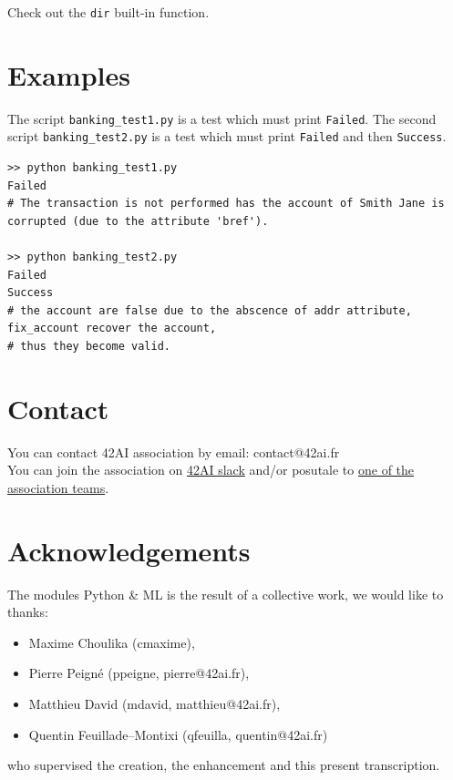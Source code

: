 \documentclass{42-en}
\begin{document}
Check out the \texttt{dir} built-in function.


\section*{Examples}
The script \texttt{banking\_test1.py} is a test which must print \texttt{Failed}.
The second script \texttt{banking\_test2.py} is a test which must print \texttt{Failed} and then \texttt{Success}.

\begin{verbatim}
>> python banking_test1.py
Failed
# The transaction is not performed has the account of Smith Jane is corrupted (due to the attribute 'bref').

>> python banking_test2.py
Failed
Success
# the account are false due to the abscence of addr attribute, fix_account recover the account,
# thus they become valid.
\end{verbatim}



\newpage

\section*{Contact}
You can contact 42AI association by email: contact@42ai.fr\\
You can join the association on \href{https://join.slack.com/t/42-ai/shared_invite/zt-ebccw5r7-YPkDM6xOiYRPjqJXkrKgcA}{42AI slack}
and/or posutale to \href{https://forms.gle/VAFuREWaLmaqZw2D8}{one of the association teams}.

\section*{Acknowledgements}
The modules Python \& ML is the result of a collective work, we would like to thanks:
\begin{itemize}
  \item Maxime Choulika (cmaxime),
  \item Pierre Peigné (ppeigne, pierre@42ai.fr),
  \item Matthieu David (mdavid, matthieu@42ai.fr),
  \item Quentin Feuillade--Montixi (qfeuilla, quentin@42ai.fr)
\end{itemize}
who supervised the creation, the enhancement and this present transcription.
\end{document}
